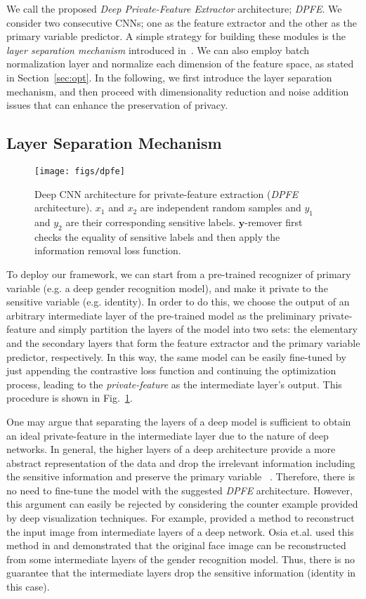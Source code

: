 \documentclass[10pt,journal,compsoc]{IEEEtran}
\begin{document}
We call the proposed \emph{Deep Private-Feature Extractor} architecture; \emph{DPFE}. We consider two consecutive CNNs; one as the feature extractor and the other as the primary variable predictor. A simple strategy for building these modules is the \emph{layer separation mechanism} introduced in~\cite{osia2017_2}. We can also employ batch normalization layer \cite{ioffe2015} and normalize each dimension of the feature space, as stated in Section~\ref{sec:opt}. In the following, we first introduce the layer separation mechanism, and then proceed with dimensionality reduction and noise addition issues that can enhance the preservation of privacy.
 

\subsection{Layer Separation Mechanism}\begin{figure}[t]
	\centering
	\texttt{[image: figs/dpfe]} 
	\caption{Deep CNN architecture for private-feature extraction (\emph{DPFE} architecture). $x_1$ and $x_2$ are independent random samples and $y_1$ and $y_2$ are their corresponding sensitive labels. $\textbf{y}$-remover first checks the equality of sensitive labels and then apply the information removal loss function.}
	\label{fig:arc}
\end{figure}%
To deploy our framework, we can start from a pre-trained recognizer of primary variable (e.g. a deep gender recognition model), and make it private to the sensitive variable (e.g. identity). In order to do this, we choose the output of an arbitrary intermediate layer of the pre-trained model as the preliminary private-feature and simply partition the layers of the model into two sets: the elementary and the secondary layers that form the feature extractor and the primary variable predictor, respectively. In this way, the same model can be easily fine-tuned by just appending the contrastive loss function and continuing the optimization process, leading to the \emph{private-feature} as the intermediate layer's output. This procedure is shown in Fig.~\ref{fig:arc}.

One may argue that separating the layers of a deep model is sufficient to obtain an ideal private-feature in the intermediate layer due to the nature of deep networks. In general, the higher layers of a deep architecture provide a more abstract representation of the data and drop the irrelevant information including the sensitive information \cite{shwartz2017} and preserve the primary variable ~\cite{yosinski2014}. Therefore, there is no need to fine-tune the model with the suggested \emph{DPFE} architecture. However, this argument can easily be rejected by considering the counter example provided by deep visualization techniques. For example, \cite{dosovitskiy2016} provided a method to reconstruct the input image from intermediate layers of a deep network. Osia et.al. used this method in \cite{osia2017_2} and demonstrated that the original face image can be reconstructed from some intermediate layers of the gender recognition model. Thus, there is no guarantee that the intermediate layers drop the sensitive information (identity in this case).
\end{document}
